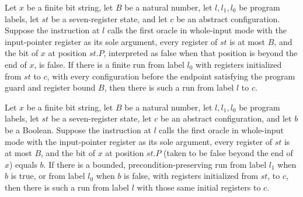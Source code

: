 \begin{lemma}
\label{Complexity.LogProg.TQBFARM.read_f}
\leanok
{}
Let $x$ be a finite bit string, let $B$ be a natural number, let $l,l_1,l_0$ be program
labels, let $st$ be a seven-register state, and let $c$ be an abstract configuration.
Suppose the instruction at $l$ calls the first oracle in whole-input mode with the
input-pointer register as its sole argument, every register of $st$ is at most $B$, and
the bit of $x$ at position $st.P$, interpreted as false when that position is beyond the
end of $x$, is false. If there is a finite run from label $l_0$ with registers
initialized from $st$ to $c$, with every configuration before the endpoint satisfying
the program guard and register bound $B$, then there is such a run from label $l$ to
$c$.
\end{lemma}

\begin{lemma}
\label{Complexity.LogProg.TQBFARM.read_b}
\leanok
{}
Let $x$ be a finite bit string, let $B$ be a natural number, let $l,l_1,l_0$ be program
labels, let $st$ be a seven-register state, let $c$ be an abstract configuration, and
let $b$ be a Boolean. Suppose the instruction at $l$ calls the first oracle in
whole-input mode with the input-pointer register as its sole argument, every register of
$st$ is at most $B$, and the bit of $x$ at position $st.P$ (taken to be false beyond the
end of $x$) equals $b$. If there is a bounded, precondition-preserving run from label
$l_1$ when $b$ is true, or from label $l_0$ when $b$ is false, with registers
initialized from $st$, to $c$, then there is such a run from label $l$ with those same
initial registers to $c$.
\end{lemma}

